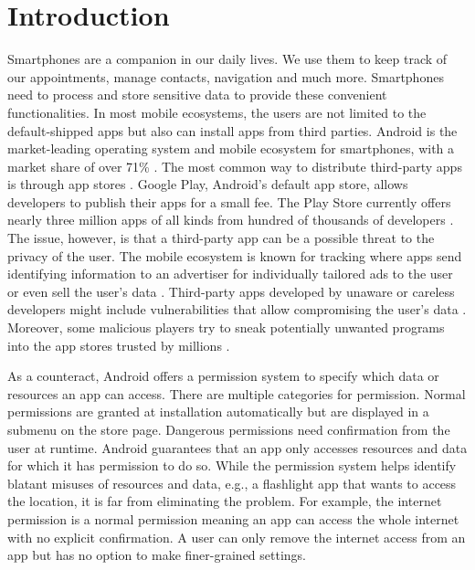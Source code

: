 \documentclass[../draft.tex]{subfiles}
\begin{document}
    \chapter{Introduction}
    Smartphones are a companion in our daily lives.
    We use them to keep track of our appointments, manage contacts, navigation and much more.
    Smartphones need to process and store sensitive data to provide these convenient functionalities.
    In most mobile ecosystems, the users are not limited to the default-shipped apps but also can install apps from third parties.
    Android is the market-leading operating system and mobile ecosystem for smartphones, with a market share of over 71\% \cite{Statista2021}.
    The most common way to distribute third-party apps is through app stores \cite{Kotzias2021}.
    Google Play, Android's default app store, allows developers to publish their apps for a small fee.
    The Play Store currently offers nearly three million apps of all kinds from hundred of thousands of developers \cite{Statista2020}.
    The issue, however, is that a third-party app can be a possible threat to the privacy of the user.
    The mobile ecosystem is known for tracking where apps send identifying information to an advertiser for individually tailored ads to the user or even sell the user's data \cite{Binns2018, Enck2011}.
    Third-party apps developed by unaware or careless developers might include vulnerabilities that allow compromising the user's data \cite{Backes2016}.
    Moreover, some malicious players try to sneak potentially unwanted programs into the app stores trusted by millions \cite{Rahman2016}.
    
    As a counteract, Android offers a permission system to specify which data or resources an app can access. 
    There are multiple categories for permission.
    Normal permissions are granted at installation automatically but are displayed in a submenu on the store page. 
    Dangerous permissions need confirmation from the user at runtime.
    Android guarantees that an app only accesses resources and data for which it has permission to do so.\footnotemark{}
    While the permission system helps identify blatant misuses of resources and data, e.g., a flashlight app that wants to access the location, it is far from eliminating the problem.
    For example, the internet permission is a normal permission meaning an app can access the whole internet with no explicit confirmation.
    A user can only remove the internet access from an app but has no option to make finer-grained settings.
\end{document}
